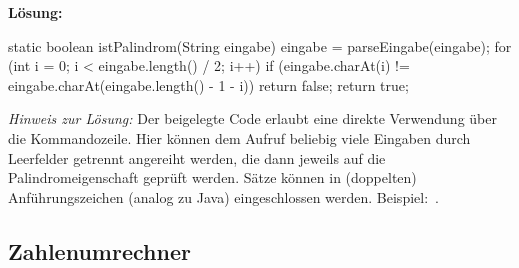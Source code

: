 \documentclass[table]{sopra-base}
\makeatletter
\newenvironment{solution}{\null\par\noindent\textbf{\textcolor{sob@col@uulm@cs}{Lösung:}}\newline\bgroup\color{black}\slshape\ignorespaces}{\egroup}
\makeatother
\begin{document}
\begin{solution}
{\begin{java}[firstnumber=34]
static boolean istPalindrom(String eingabe) {
    eingabe = parseEingabe(eingabe);
    for (int i = 0; i < eingabe.length() / 2; i++) {
        if (eingabe.charAt(i) != eingabe.charAt(eingabe.length() - 1 - i))
            return false;
    }
    return true;
}
    \end{java}
    }
    \textit{Hinweis zur Lösung:} Der beigelegte Code erlaubt eine direkte Verwendung über die Kommandozeile. Hier können dem Aufruf  beliebig viele Eingaben durch Leerfelder getrennt angereiht werden, die dann jeweils auf die Palindromeigenschaft geprüft werden. Sätze können in (doppelten) Anführungszeichen (analog zu Java) eingeschlossen werden. Beispiel:
    \,.
\end{solution}

\subsection{Zahlenumrechner}
\end{document}
